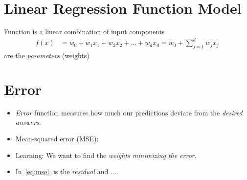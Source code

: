 \documentclass[
	number={5},
	title={Linear Regression}
]{cs584notes}
\begin{document}
\section{Linear Regression Function Model}\label{sec:linear-regression-function-model}
Function  is a linear combination of input components
\begin{equation*}
\begin{aligned}
	f(x) &= w_{0} + w_{1}x_{1} + w_{2}x_{2} + \dots + w_{d}x_{d} = w_{0} + \sum_{j=1}^{d} w_{j}x_{j}
\end{aligned}
\end{equation*}
 are the \emph{parameters} (weights)

\section{Error}\label{sec:error}
\begin{itemize}
	\item \emph{Error} function measures how much our predictions deviate from the \emph{desired answers}.
	\item Mean-squared error (MSE):
	\item Learning: We want to find the \emph{weights minimizing the error}.
	\item In~\eqref{eq:mse},  is the \emph{residual\label{dfn:residual}} and $\dots$.
\end{itemize}
\end{document}
